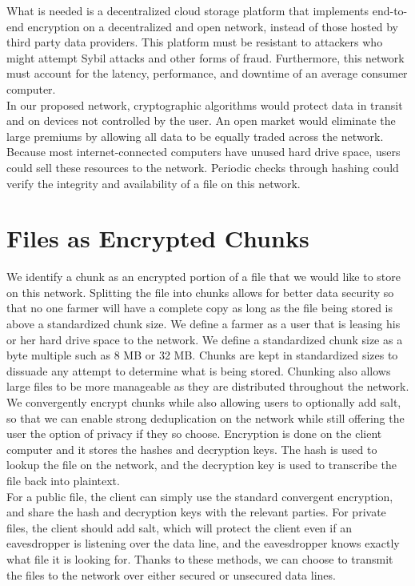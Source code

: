 \documentclass[a4paper,10pt]{article}
\begin{document}
What is needed is a decentralized cloud storage platform that implements end-to-end encryption on a decentralized and open network, instead of those hosted by third party data providers. This platform must be resistant to attackers who might attempt Sybil attacks and other forms of fraud. Furthermore, this network must account for the latency, performance, and downtime of an average consumer computer.\\

In our proposed network, cryptographic algorithms would protect data in transit and on devices not controlled by the user. An open market would eliminate the large premiums by allowing all data to be equally traded across the network. Because most internet-connected computers have unused hard drive space, users could sell these resources to the network. Periodic checks through hashing could verify the integrity and availability of a file on this network. \\

\section{Files as Encrypted Chunks}
We identify a chunk as an encrypted portion of a file that we would like to store on this network. Splitting the file into chunks allows for better data security so that no one farmer will have a complete copy as long as the file being stored is above a standardized chunk size. We define a farmer as a user that is leasing his or her hard drive space to the network. We define a standardized chunk size as a byte multiple such as 8 MB or 32 MB. Chunks are kept in standardized sizes to dissuade any attempt to determine what is being stored. Chunking also allows large files to be more manageable as they are distributed throughout the network.\\

We convergently encrypt chunks while also allowing users to optionally add salt, so that we can enable strong deduplication on the network while still offering the user the option of privacy if they so choose. Encryption is done on the client computer and it stores the hashes and decryption keys. The hash is used to lookup the file on the network, and the decryption key is used to transcribe the file back into plaintext.\\

For a public file, the client can simply use the standard convergent encryption, and share the hash and decryption keys with the relevant parties. For private files, the client should add salt, which will protect the client even if an eavesdropper is listening over the data line, and the eavesdropper knows exactly what file it is looking for. Thanks to these methods, we can choose to transmit the files to the network over either secured or unsecured data lines.
\end{document}
